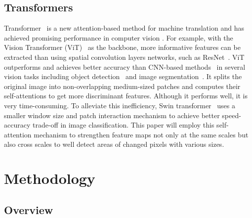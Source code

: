 \documentclass[letterpaper]{article} \usepackage{aaai23}  \usepackage{times}  \usepackage{helvet}  \usepackage{courier}  \usepackage[hyphens]{url}  \usepackage{graphicx} \urlstyle{rm} \def\UrlFont{\rm}  \usepackage{natbib}  \usepackage{caption} \frenchspacing  \setlength{\pdfpagewidth}{8.5in}  \setlength{\pdfpageheight}{11in}  \usepackage{algorithm}
\begin{document}
\subsection{Transformers}
\vspace{-0.1 em}

Transformer~\cite{NIPS2017_3f5ee243} is a new attention-based method for machine translation and has achieved promising performance in computer vision \cite{Rezatofighi_2019_CVPR,NEURIPS2020_9d684c58}. For example, with the Vision Transformer (ViT)~\cite{11929} as the backbone, more informative features can be extracted than using spatial convolution layers networks, such as ResNet~\cite{NEURIPS2019_3416a75f}. ViT outperforms and achieves better accuracy than CNN-based methods~\cite{NEURIPS2019_3416a75f, liu2016ssd, bochkovskiy2020yolov4} in several vision tasks including object detection~\cite{Rezatofighi_2019_CVPR} and image segmentation~\cite{NEURIPS2020_9d684c58}.  It splits the original image into non-overlapping medium-sized patches and computes their self-attentions to get more discriminant features. Although it performs well, it is very time-consuming. To alleviate this inefficiency, Swin transformer~\cite{Liu_2021_ICCV} uses a smaller window size and patch interaction mechanism to achieve better speed-accuracy trade-off in image classification.
This paper will employ this self-attention mechanism to strengthen feature maps not only at the same
scales but also cross scales to well detect areas of changed pixels with various sizes.

\section{Methodology}
\subsection{Overview}
\end{document}
